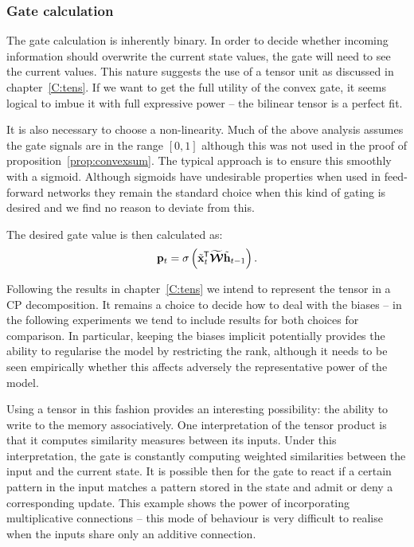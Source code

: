 \subsubsection{Gate calculation}
The gate calculation is inherently binary. In order to decide whether incoming information should
overwrite the current state values, the gate will need to see the current values. This nature suggests
the use of a tensor unit as discussed in chapter~\ref{C:tens}. If we want to get the full utility of
the convex gate, it seems logical to imbue it with full expressive power -- the bilinear tensor is a
perfect fit.

It is also necessary to choose a non-linearity. Much of the above analysis assumes the gate signals are
in the range \([0, 1]\) although this was not used in the proof of proposition~\ref{prop:convexsum}. The
typical approach is to ensure this smoothly with a sigmoid. Although sigmoids have undesirable
properties when used in feed-forward networks \autocite{Glorot2010} they remain the standard choice
when this kind of gating is desired \autocite{VandenOord2016, Oord2016} and we find no reason to
deviate from this.

The desired gate value is then calculated as:
\begin{equation}\label{eq:propgatevalue}
	\mathbf{p}_t = \sigma\left(\tilde{\mathbf{x}}^{\mkern-1.5mu\mathsf{T}}_t\widetilde{\bm{\mathcal{W}}}\tilde{\mathbf{h}}_{t-1} \right).
\end{equation}

Following the results in chapter~\ref{C:tens} we intend to represent the tensor in a CP decomposition.
It remains a choice to decide how to deal with the biases -- in the following experiments we tend to
include results for both choices for comparison. In particular, keeping the biases implicit potentially
provides the ability to regularise the model by restricting the rank, although it needs to be seen
empirically whether this affects adversely the representative power of the model.

Using a tensor in this fashion provides an interesting possibility: the ability to write to the memory
associatively. One interpretation of the tensor product is that it computes similarity measures between
its inputs. Under this interpretation, the gate is constantly computing weighted similarities between
the input and the current state. It is possible then for the gate to react if a certain pattern in the
input matches a pattern stored in the state and admit or deny a corresponding update. This example
shows the power of incorporating multiplicative connections -- this mode of behaviour is very difficult
to realise when the inputs share only an additive connection.

